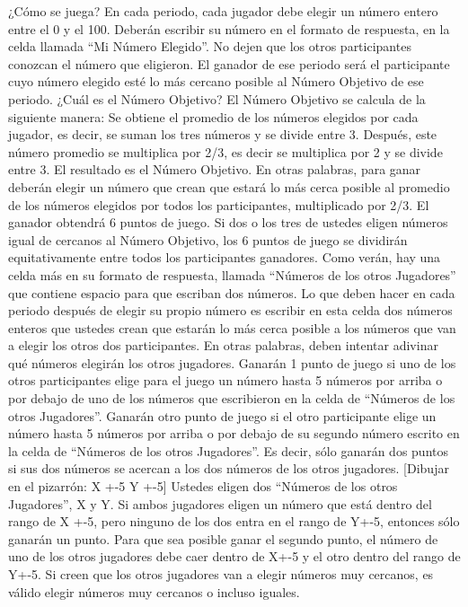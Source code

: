 ¿Cómo se juega? En cada periodo, cada jugador debe elegir un número entero entre el 0 y el 100. Deberán escribir su número en el formato de respuesta, en la celda llamada “Mi Número Elegido”. No dejen que los otros participantes conozcan el número que eligieron.
El ganador de ese periodo será el participante cuyo número elegido esté lo más cercano posible al Número Objetivo de ese periodo. ¿Cuál es el Número Objetivo? El Número Objetivo se calcula de la siguiente manera:
Se obtiene el promedio de los números elegidos por cada jugador, es decir, se suman los tres números y se divide entre 3. Después, este número promedio se multiplica por 2/3, es decir se multiplica por 2 y se divide entre 3. El resultado es el Número Objetivo.
En otras palabras, para ganar deberán elegir un número que crean que estará lo más cerca posible al promedio de los números elegidos por todos los participantes, multiplicado por 2/3. El ganador obtendrá 6 puntos de juego. Si dos o los tres de ustedes eligen números igual de cercanos al Número Objetivo, los 6 puntos de juego se dividirán equitativamente entre todos los participantes ganadores.
Como verán, hay una celda más en su formato de respuesta, llamada “Números de los otros Jugadores” que contiene espacio para que escriban dos números. Lo que deben hacer en cada periodo después de elegir su propio número es escribir en esta celda dos números enteros que ustedes crean que estarán lo más cerca posible a los números que van a elegir los otros dos participantes. En otras palabras, deben intentar adivinar qué números elegirán los otros jugadores.
Ganarán 1 punto de juego si uno de los otros participantes elige para el juego un número hasta 5 números por arriba o por debajo de uno de los números que escribieron en la celda de “Números de los otros Jugadores”. Ganarán otro punto de juego si el otro participante elige un número hasta 5 números por arriba o por debajo de su segundo número escrito en la celda de “Números de los otros Jugadores”.
Es decir, sólo ganarán dos puntos si sus dos números se acercan a los dos números de los otros jugadores.
[Dibujar en el pizarrón:		X +-5			Y +-5]
Ustedes eligen dos “Números de los otros Jugadores”, X y Y. Si ambos jugadores eligen un número que está dentro del rango de X +-5, pero ninguno de los dos entra en el rango de Y+-5, entonces sólo ganarán un punto. Para que sea posible ganar el segundo punto, el número de uno de los otros jugadores debe caer dentro de X+-5 y el otro dentro del rango de Y+-5. Si creen que los otros jugadores van a elegir números muy cercanos, es válido elegir números muy cercanos o incluso iguales.

